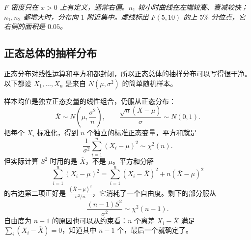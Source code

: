 \begin{center}
\begin{minipage}{\linewidth}
\centering
{}
\par\vspace{2pt}
{\footnotesize\itshape $F$ 密度只在 $x>0$ 上有定义，通常右偏。$n_1$ 较小时曲线在左端较高、衰减较快；$n_1,n_2$ 都增大时，分布向 $1$ 附近集中。虚线标出 $F(5,10)$ 的上 $5\%$ 分位点，它右侧的面积是 $0.05$。}
\end{minipage}
\end{center}

\subsection{正态总体的抽样分布}

正态分布对线性运算和平方和都封闭，所以正态总体的抽样分布可以写得很干净。以下都设 $X_1,\dots,X_n$ 是来自 $N(\mu,\sigma^2)$ 的简单随机样本。

样本均值是独立正态变量的线性组合，仍服从正态分布：
\[
    \overline{X}\sim N\!\left(\mu,\frac{\sigma^2}{n}\right),
    \qquad
    \frac{\sqrt{n}(\overline{X}-\mu)}{\sigma}\sim N(0,1).
\]
把每个 $X_i$ 标准化，得到 $n$ 个独立的标准正态变量，平方和就是
\[
    \frac{1}{\sigma^2}\sum_{i=1}^{n}(X_i-\mu)^2\sim\chi^2(n).
\]
但实际计算 $S^2$ 时用的是 $\overline{X}$，不是 $\mu$。平方和分解
\[
    \sum_{i=1}^{n}(X_i-\mu)^2
    =\sum_{i=1}^{n}(X_i-\overline{X})^2+n(\overline{X}-\mu)^2
\]
的右边第二项正好是 $\frac{(\overline{X}-\mu)^2}{\sigma^2/n}$，它消耗了一个自由度。剩下的部分服从
\[
    \frac{(n-1)S^2}{\sigma^2}\sim\chi^2(n-1).
\]
自由度为 $n-1$ 的原因也可以从约束看：$n$ 个离差 $X_i-\overline{X}$ 满足 $\sum_i(X_i-\overline{X})=0$，知道其中 $n-1$ 个，最后一个就确定了。

